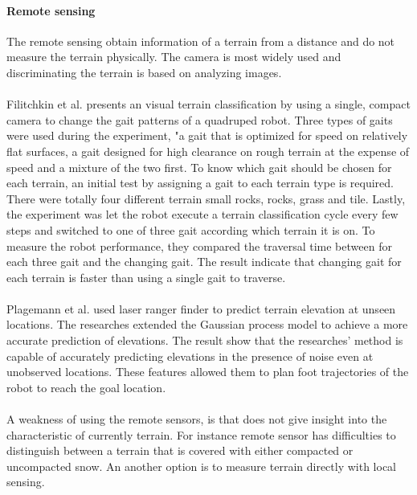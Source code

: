 \documentclass[USenglish]{ifimaster}  %
\begin{document}
\paragraph{Remote sensing}
The remote sensing obtain information of a terrain from a distance and do not measure the terrain physically. The camera is most widely used and discriminating the terrain is based on analyzing images.
\\
\\ 
Filitchkin et al. \cite{littleDog} presents an visual terrain classification by using a single, compact camera to change the gait patterns of a quadruped robot. Three types of gaits were used during the experiment, "a gait that is optimized for speed on relatively flat surfaces, a gait designed for high clearance on rough terrain at the expense of speed and a mixture of the two first. To know which gait should be chosen for each terrain, an initial test by assigning a gait to each terrain type is required. There were totally four different terrain small rocks, rocks, grass and tile. Lastly, the experiment was let the robot execute a terrain classification cycle every few steps and switched to one of three gait according which terrain it is on. To measure the robot performance, they compared the traversal time between for each three gait and the changing gait. The result indicate that changing gait for each terrain is faster than using a single gait to traverse.
\\
\\
Plagemann et al. \cite{4651026} used laser ranger finder to predict terrain elevation at unseen locations.
The researches extended the Gaussian process model to achieve a more accurate prediction of elevations. The result show that the researches' method is capable of accurately predicting elevations in the presence of noise even at unobserved locations. These features allowed them to plan foot trajectories of the robot to reach the goal location. 
\\
\\
A weakness of using the remote sensors, is that does not give insight into the characteristic of currently terrain. For instance remote sensor has difficulties to distinguish between a terrain that is covered with either compacted or uncompacted snow. An another option is to measure terrain directly with local sensing. 
\end{document}

